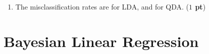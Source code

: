 \documentclass[twoside]{article}
\begin{document}
\begin{enumerate}
\begin{enumerate}
\item Complete function \textsf{discrimAnalysis} in \textsf{ldaqda.py} to
	visualize LDA and QDA models and the corresponding decision boundaries. Please name the figures as \textsf{lda.pdf}, and \textsf{qda.pdf}. ({\bf $1$ pt})

\end{enumerate}
\item The misclassification rates are  for LDA, and  for QDA. ({\bf $1$ pt})
\end{enumerate}

\newpage

\section{Bayesian Linear Regression}
\end{document}
